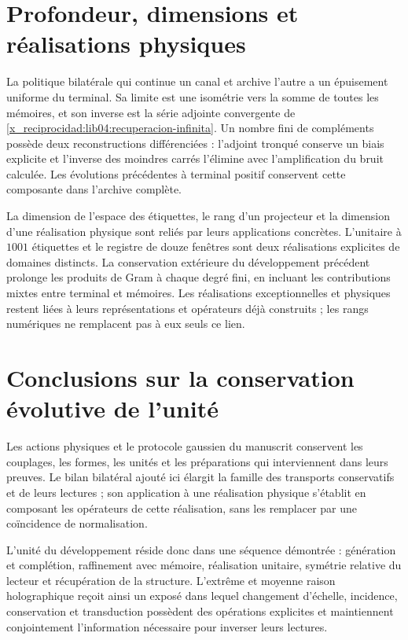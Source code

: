 \section{Profondeur, dimensions et réalisations physiques}
\label{x_reciprocidad:lib06:profundidad}

La politique bilatérale qui continue un canal et archive l’autre
a un épuisement uniforme du terminal. Sa limite est une
isométrie vers la somme de toutes les mémoires, et son inverse est
la série adjointe convergente de
\eqref{x_reciprocidad:lib04:recuperacion-infinita}. Un nombre fini de
compléments possède deux reconstructions différenciées :
l’adjoint tronqué conserve un biais explicite et l’inverse des
moindres carrés l’élimine avec l’amplification du bruit
calculée. Les évolutions précédentes à terminal positif
conservent cette composante dans l’archive complète.

La dimension de l’espace des étiquettes, le rang d’un projecteur et
la dimension d’une réalisation physique sont reliés par
leurs applications concrètes. L’unitaire à \(1001\) étiquettes et le
registre de douze fenêtres sont deux réalisations explicites de
domaines distincts. La conservation extérieure du développement
précédent prolonge les produits de Gram à chaque degré fini,
en incluant les contributions mixtes entre terminal et mémoires.
Les réalisations exceptionnelles et physiques restent liées
à leurs représentations et opérateurs déjà construits ; les rangs
numériques ne remplacent pas à eux seuls ce lien.

\section{Conclusions sur la conservation évolutive de l'unité}
Les actions physiques et le protocole gaussien du manuscrit conservent les couplages, les formes, les unités et les préparations qui interviennent dans leurs preuves. Le bilan bilatéral ajouté ici élargit la famille des transports conservatifs et de leurs lectures ; son application à une réalisation physique s'établit en composant les opérateurs de cette réalisation, sans les remplacer par une coïncidence de normalisation.

L'unité du développement réside donc dans une séquence démontrée : génération et complétion, raffinement avec mémoire, réalisation unitaire, symétrie relative du lecteur et récupération de la structure. L'extrême et moyenne raison holographique reçoit ainsi un exposé dans lequel changement d'échelle, incidence, conservation et transduction possèdent des opérations explicites et maintiennent conjointement l'information nécessaire pour inverser leurs lectures.
